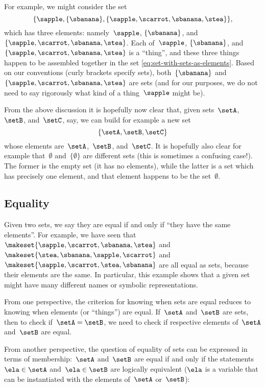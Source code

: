 For example, we might consider the set
%
\begin{equation}\label{eq:set-with-sets-as-elements}
    \{ \sapple, \{ \sbanana \}, \{ \sapple, \scarrot, \sbanana, \stea \} \},
\end{equation}
%
which has three elements: namely~$\sapple$, $\{ \sbanana \}$, and~$\{ \sapple, \scarrot, \sbanana, \stea \}$.
Each of~$\sapple$, $\{ \sbanana \}$, and~$\{ \sapple, \scarrot, \sbanana, \stea \}$ is a ``thing'', and these three things happen to be assembled together in the set \cref{eq:set-with-sets-as-elements}.
Based on our conventions (curly brackets specify sets), both~$\{ \sbanana \}$ and~$\{ \sapple, \scarrot, \sbanana, \stea \}$ are sets (and for our purposes, we do not need to say rigorously what kind of a thing~$\sapple$ might be).

From the above discussion it is hopefully now clear that, given sets~$\setA$,~$\setB$, and~$\setC$, say, we can build for example a new set
\begin{equation*}
    \{ \setA, \setB, \setC \}
\end{equation*}
whose elements are~$\setA$,~$\setB$, and~$\setC$.
It is hopefully also clear for example that~$\emptyset$ and~$\{ \emptyset \}$ are different sets (this is sometimes a confusing case!).
The former is the empty set (it has no elements), while the latter is a set which has precisely one element, and that element happens to be the set~$\emptyset$.

\subsection{Equality}

Given two sets, we say they are equal if and only if ``they have the same elements''.
For example, we have seen that~$\makeset{ \sapple, \scarrot, \sbanana, \stea }$ and~$\makeset{ \stea, \sbanana, \sapple, \scarrot}$ and~$\makeset{ \sapple, \scarrot, \stea, \sbanana }$ are all equal as sets, because their elements are the same.
In particular, this example shows that a given set might have many different names or symbolic representations.

From one perspective, the criterion for knowing when sets are equal reduces to knowing when elements (or ``things'') are equal.
If~$\setA$ and~$\setB$ are sets, then to check if~$\setA = \setB$, we need to check if respective elements of~$\setA$ and~$\setB$ are equal.

From another perspective, the question of equality of sets can be expressed in terms of membership:~$\setA$ and~$\setB$ are equal if and only if the statements~$\ela \in \setA$ and~$\ela \in \setB$ are logically equivalent ($\ela$ is a variable that can be instantiated with the elements of~$\setA$ or~$\setB$):

